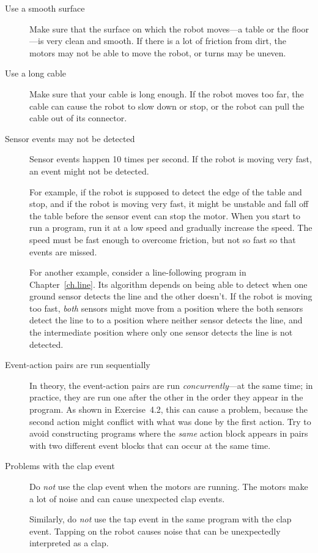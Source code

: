 \begin{description}

\item[Use a smooth surface]
Make sure that the surface on which the robot moves---a table or the floor---is
very clean and smooth. If there is a lot of friction from dirt,
the motors may not be able to move the robot, or turns may be uneven.

\item[Use a long cable]
Make sure that your cable is long enough.
If the robot moves too far, the cable can cause the robot to slow down
or stop, or the robot can pull the cable out of its connector.

\item[Sensor events may not be detected]
Sensor events happen 10 times per second.
If the robot is moving very fast,
an event might not be detected.

For example, if the robot is supposed to detect the edge of the table and stop,
and if the robot is moving very fast, it might be unstable and fall off the table
before the sensor event can stop the motor.
When you start to run a program, run it at a low speed
and gradually increase the speed.
The speed must be fast enough to overcome friction, but not so fast so that
events are missed.

For another example, consider a line-following program in Chapter~\ref{ch.line}.
Its algorithm depends on being able to detect when one
ground sensor detects the line and the other doesn't.
If the robot is moving too fast, \emph{both} sensors
might move from a position where the both sensors detect the line to
to a position where neither sensor detects the line,
and the intermediate position where only one sensor
detects the line is not detected.

\item[Event-action pairs are run sequentially]
In theory, the event-action pairs are run \emph{concurrently}---at the same
time; in practice, they are run one after the other in the order they appear
in the program. As shown in Exercise~4.2, this can cause a problem, because
the second action might conflict with what was done by the first action.
Try to avoid constructing programs where the \emph{same} action block
appears in pairs with two different event blocks that can occur at the same time.

\item[Problems with the clap event]
Do \emph{not} use the clap event 
when the motors are running. The motors make a lot of noise and
can cause unexpected clap events.

Similarly, do \emph{not} use the tap event 
in the same program with the clap event. Tapping on the robot causes
noise that can be unexpectedly interpreted as a clap.


\end{description}